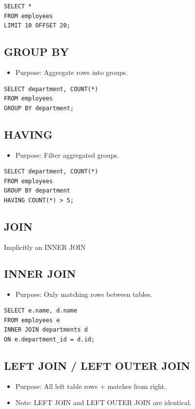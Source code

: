 \documentclass[10pt]{article}
\begin{document}
\begin{verbatim}
SELECT *
FROM employees
LIMIT 10 OFFSET 20;
\end{verbatim}

\subsection{GROUP BY}
\begin{itemize}
    \item Purpose: Aggregate rows into groups.
\end{itemize}

\begin{verbatim}
SELECT department, COUNT(*)
FROM employees
GROUP BY department;
\end{verbatim}

\subsection{HAVING}
\begin{itemize}
    \item Purpose: Filter aggregated groups.
\end{itemize}

\begin{verbatim}
SELECT department, COUNT(*)
FROM employees
GROUP BY department
HAVING COUNT(*) > 5;
\end{verbatim}

\subsection{JOIN}
Implicitly an INNER JOIN

\subsection{INNER JOIN}
\begin{itemize}
    \item Purpose: Only matching rows between tables.
\end{itemize}

\begin{verbatim}
SELECT e.name, d.name
FROM employees e
INNER JOIN departments d
ON e.department_id = d.id;
\end{verbatim}

\subsection{LEFT JOIN / LEFT OUTER JOIN}
\begin{itemize}
    \item Purpose: All left table rows + matches from right.
    \item Note: LEFT JOIN and LEFT OUTER JOIN are identical.
\end{itemize}
\end{document}

